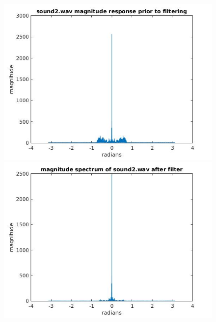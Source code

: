 \documentclass{article}
\begin{document}
\begin{figure}[H]
\includegraphics[scale = .5]{report7_1}
\includegraphics[scale = .5]{report7_3}
\end{figure}

\begin{figure}[H]

\end{figure}
\end{document}
